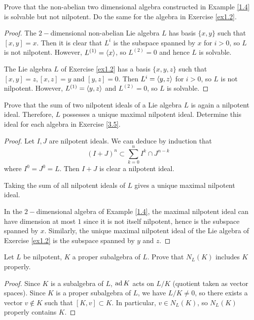 \begin{ex}\label{3.5}
  Prove that the non-abelian two dimensional algebra constructed in Example \ref{1.4} is solvable but not nilpotent. Do the same for the algebra in Exercise \ref{ex1.2}.
\end{ex}
\begin{proof}
  The $2-$dimensional non-abelian Lie algebra $L$ has basis $\{x, y\}$ such that $[x, y] = x$. Then it is clear that $L^i$ is the subspace spanned by $x$ for $i > 0$, so $L$ is not nilpotent. However, $L^{(1)} = \langle x \rangle$, so $L^{(2)} = 0$ and hence $L$ is solvable.

  The Lie algebra $L$ of Exercise \ref{ex1.2} has a basis $\{x, y, z\}$ such that $[x, y] = z, [x, z] = y$ and $[y, z] = 0$. Then $L^i = \langle y, z \rangle$ for $i > 0$, so $L$ is not nilpotent. However, $L^{(1)} = \langle y, z\rangle$ and $L^{(2)} = 0$, so $L$ is solvable.
\end{proof}

\begin{ex}
  Prove that the sum of two nilpotent ideals of a Lie algebra $L$ is again a nilpotent ideal. Therefore, $L$ possesses a unique maximal nilpotent ideal. Determine this ideal for each algebra in Exercise \ref{3.5}.
\end{ex}
\begin{proof}
  Let $I, J$ are nilpotent ideals. We can deduce by induction that
  \begin{equation*}
    (I + J)^n\subset \sum_{k=0}^n I^k\cap J^{n-k}
  \end{equation*}
  where $I^0=J^0=L$. Then $I+J$ is clear a nilpotent ideal.

  Taking the sum of all nilpotent ideals of $L$ gives a unique maximal nilpotent ideal.

  In the $2-$dimensional algebra of Example \ref{1.4}, the maximal nilpotent ideal can have dimension at most $1$ since it is not itself nilpotent, hence is the subspace spanned by $x$.
  Similarly, the unique maximal nilpotent ideal of the Lie algebra of Exercise \ref{ex1.2} is the subspace spanned by $y$ and $z$.
\end{proof}

\begin{ex}
  Let $L$ be nilpotent, $K$ a proper subalgebra of $L$. Prove that $N_L(K)$ includes $K$ properly.
\end{ex}
\begin{proof}
  Since $K$ is a subalgebra of $L$, $\operatorname{ad} K$ acts on $L/K$ (quotient taken as vector spaces). Since $K$ is a proper subalgebra of $L$, we have $L/K \neq 0$, so there exists a vector $v \not\in K$ such that $[K, v] \subset K$. In particular, $v \in N_L(K)$, so $N_L(K)$ properly contains $K$.
\end{proof}

